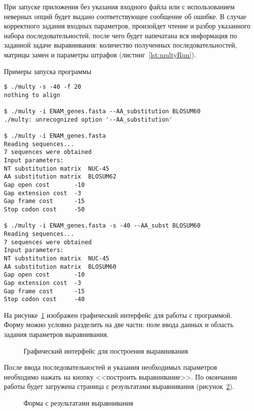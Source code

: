 При запуске приложения без указания входного файла или с использованием неверных опций будет выдано соответствующее сообщение об ошибке. В случае корректного задания входных параметров, произойдет чтение и разбор указанного набора последовательностей, после чего будет напечатана вся информация по заданной задаче выравнивания: количество полученных последовательностей, матрицы замен и параметры штрафов (листинг~\ref{lst:multyRun}).

\begin{algorithm}
	\caption{Примеры запуска программы} \label{lst:multyRun}
	\begin{lstlisting}
$ ./multy -s -40 -f 20
nothing to align

$ ./multy -i ENAM_genes.fasta --AA_substitution BLOSUM60
./multy: unrecognized option '--AA_substitution'

$ ./multy -i ENAM_genes.fasta 
Reading sequences...
7 sequences were obtained
Input parameters:
NT substitution matrix	NUC-45
AA substitution matrix	BLOSUM62
Gap open cost		-10
Gap extension cost	-3
Gap frame cost		-15
Stop codon cost		-50

$ ./multy -i ENAM_genes.fasta -s -40 --AA_subst BLOSUM60
Reading sequences...
7 sequences were obtained
Input parameters:
NT substitution matrix	NUC-45
AA substitution matrix	BLOSUM60
Gap open cost		-10
Gap extension cost	-3
Gap frame cost		-15
Stop codon cost		-40
	\end{lstlisting}
\end{algorithm}

На рисунке~\ref{ris:webka} изображен графический интерфейс для работы с программой. Форму можно условно разделить на две части: поле ввода данных и область задания параметров выравнивания. 

\begin{figure}[H]
	\caption{Графический интерфейс для построения выравнивания}
	\label{ris:webka}
\end{figure}

После ввода последовательностей и указания необходимых параметров необходимо нажать на кнопку <<построить выравнивание>>. По окончании работы будет загружена страница с результатами выравнивания (рисунок~\ref{ris:webkares}).

\begin{figure}[h]
	\caption{Форма с результатами выравнивания}
	\label{ris:webkares}
\end{figure}

